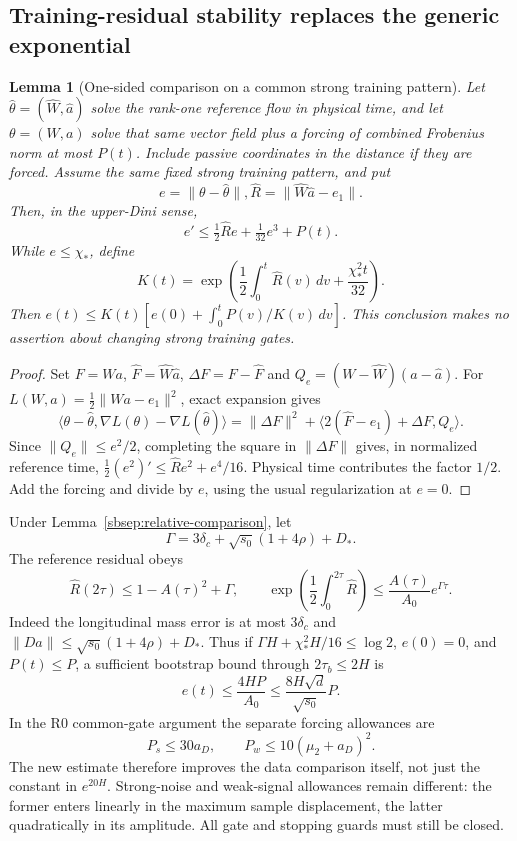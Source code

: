 \documentclass{article} %
\theoremstyle{plain}
\newtheorem{lemma}[theorem]{Lemma}
\theoremstyle{definition}
\theoremstyle{remark}
\begin{document}
\subsection{Training-residual stability replaces the generic exponential}

\begin{lemma}[One-sided comparison on a common strong training pattern]
\label{sbquant:stability}
Let $\widehat\theta=(\widehat W,\widehat a)$ solve the rank-one reference
flow in physical time, and let $\theta=(W,a)$ solve that same vector field
plus a forcing of combined Frobenius norm at most $P(t)$. Include passive
coordinates in the distance if they are forced. Assume the same fixed
strong training pattern, and put
\[
 e=\|\theta-\widehat\theta\|,
 \widehat R=\|\widehat W\widehat a-e_1\|.
\]
Then, in the upper-Dini sense,
\begin{equation}\label{sbquant:distance-ode}
 e'\le\tfrac12\widehat R e+\tfrac1{32}e^3+P(t).
\end{equation}
While $e\le\chi_*$, define
\[
 K(t)=\exp\left(\frac12\int_0^t\widehat R(v)\,dv
                     +\frac{\chi_*^2t}{32}\right).
\]
Then $e(t)\le K(t)[e(0)+\int_0^tP(v)/K(v)\,dv]$.
This conclusion makes no assertion about changing strong training gates.
\end{lemma}
\begin{proof}
Set $F=Wa$, $\widehat F=\widehat W\widehat a$,
$\Delta F=F-\widehat F$ and $Q_e=(W-\widehat W)(a-\widehat a)$.
For $L(W,a)=\frac12\|Wa-e_1\|^2$, exact expansion gives
\[
 \langle\theta-\widehat\theta,\nabla L(\theta)-\nabla L(\widehat\theta)\rangle
 =\|\Delta F\|^2+
   \langle2(\widehat F-e_1)+\Delta F,Q_e\rangle.
\]
Since $\|Q_e\|\le e^2/2$, completing the square in $\|\Delta F\|$
gives, in normalized reference time,
$\frac12(e^2)'\le\widehat R e^2+e^4/16$.
Physical time contributes the factor $1/2$. Add the forcing and divide
by $e$, using the usual regularization at $e=0$.
\end{proof}

Under Lemma~\ref{sbsep:relative-comparison}, let
\[
 \Gamma=3\delta_c+\sqrt{s_0}(1+4\rho)+D_*.
\]
The reference residual obeys
\[
 \widehat R(2\tau)\le1-A(\tau)^2+\Gamma,
 \qquad
 \exp\left(\frac12\int_0^{2\tau}\widehat R\right)
 \le\frac{A(\tau)}{A_0}e^{\Gamma\tau}.
\]
Indeed the longitudinal mass error is at most $3\delta_c$ and
$\|Da\|\le\sqrt{s_0}(1+4\rho)+D_*$.
Thus if $\Gamma H+\chi_*^2H/16\le\log2$, $e(0)=0$, and
$P(t)\le P$, a sufficient bootstrap bound through $2\tau_b\le2H$ is
\begin{equation}\label{sbquant:polynomial-comparison}
 e(t)\le\frac{4HP}{A_0}
 \le\frac{8H\sqrt d}{\sqrt{s_0}}P.
\end{equation}
In the R0 common-gate argument the separate forcing allowances are
\[
 P_s\le30a_D,\qquad P_w\le10(\mu_2+a_D)^2.
\]
The new estimate therefore improves the data comparison itself, not just
the constant in $e^{20H}$. Strong-noise and weak-signal allowances remain
different: the former enters linearly in the maximum sample displacement,
the latter quadratically in its amplitude. All gate and stopping guards
must still be closed.
\end{document}
